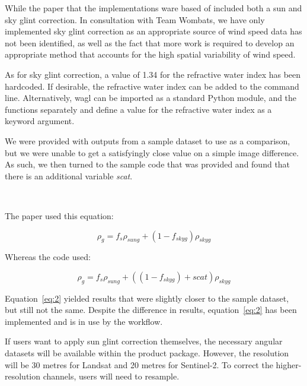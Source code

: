 \documentclass[a4paper]{article}
\begin{document}
    \begin{flushleft}
      While the paper that the implementations ware based of included both a sun and sky glint correction. In consultation with Team Wombats, we have only implemented sky glint correction as an appropriate source of wind speed data has not been identified, as well as the fact that more work is required to develop an appropriate method that accounts for the high spatial variability of wind speed. \par
      As for sky glint correction, a value of 1.34 for the refractive water index has been hardcoded. If desirable, the refractive water index can be added to the command line. Alternatively, wagl can be imported as a standard Python module, and the functions separately and define a value for the refractive water index as a keyword argument. \par
      We were provided with outputs from a sample dataset to use as a comparison, but we were unable to get a satisfyingly close value on a simple image difference. As such, we then turned to the sample code that was provided and found that there is an additional variable \textit{scat}. \par
\(\phantom{0}\)
      \par
      The paper used this equation: 
    \end{flushleft}

    \begin{equation} \label{eq:1}
      \rho_{g} = f_{s}\rho_{sung} + (1 - f_{skyg})\rho_{skyg}
    \end{equation}

     \begin{flushleft}
      Whereas the code used:
    \end{flushleft}

    \begin{equation} \label{eq:2}
      \rho_{g} = f_{s}\rho_{sung} + ((1 - f_{skyg})+scat)\rho_{skyg}
    \end{equation}

    \begin{flushleft}
      Equation~\ref{eq:2} yielded results that were slightly closer to the sample dataset, but still not the same. Despite the difference in results, equation~\ref{eq:2} has been implemented and is in use by the workflow. \par
      If users want to apply sun glint correction themselves, the necessary angular datasets will be available within the product package. However, the resolution will be 30 metres for Landsat and 20 metres for Sentinel-2. To correct the higher-resolution channels, users will need to resample.
    \end{flushleft}
\end{document}
